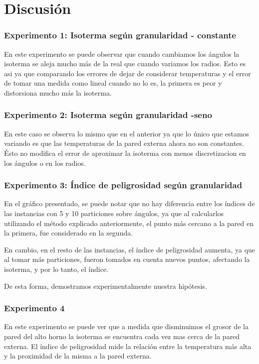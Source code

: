 \section{Discusión}

  \subsubsection*{Experimento 1: Isoterma según granularidad - constante}
    En este experimento se puede observar que cuando cambiamos los ángulos la isoterma se aleja mucho más de la real que cuando variamos los radios. Esto es asi ya que comparando los errores de dejar de considerar temperaturas y el error de tomar una medida como lineal cuando no lo es, la primera es peor y distorsiona mucho más la isoterma.
    
  \subsubsection*{Experimento 2: Isoterma según granularidad -seno}
    En este caso se observa lo mismo que en el anterior ya que lo único que estamos variando es que las temperaturas de la pared externa ahora no son constantes. Ésto no modifica el error de aproximar la isoterma con menos discretizacion en los ángulos o en los radios.

  \subsubsection*{Experimento 3: Índice de peligrosidad según granularidad}
    En el gráfico presentado, se puede notar que no hay diferencia entre los índices de las instancias con 5 y 10 particiones sobre ángulos, ya que al calcularlos utilizando el método explicado anteriormente, el punto más cercano a la pared en la primera, fue considerado en la segunda. 

    En cambio, en el resto de las instancias, el índice de peligrosidad aumenta, ya que al tomar más particiones, fueron tomados en cuenta nuevos puntos, afectando la isoterma, y por lo tanto, el índice. 

    De esta forma, demostramos experimentalmente nuestra hipótesis. 

  \subsubsection*{Experimento 4}
    En este experimento se puede ver que a medida que disminuimos el grosor de la pared del alto horno la isoterma se encuentra cada vez mas cerca de la pared externa. El índice de peligrosidad mide la relación entre la temperatura más alta y la proximidad de la misma a la pared externa. 

